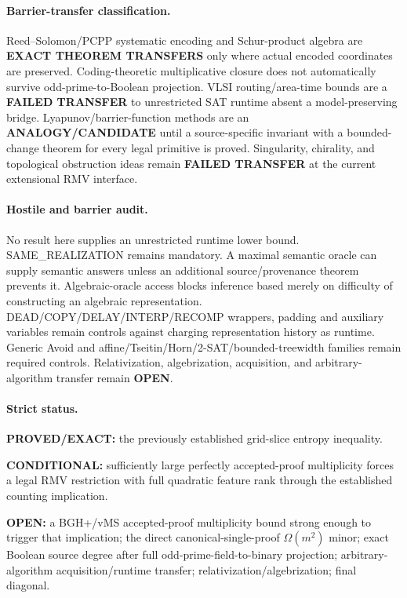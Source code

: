 \documentclass[11pt]{article}
\begin{document}
\paragraph{Barrier-transfer classification.}
Reed--Solomon/PCPP systematic encoding and Schur-product algebra are \textbf{EXACT THEOREM TRANSFERS} only where actual encoded coordinates are preserved. Coding-theoretic multiplicative closure does not automatically survive odd-prime-to-Boolean projection. VLSI routing/area-time bounds are a \textbf{FAILED TRANSFER} to unrestricted SAT runtime absent a model-preserving bridge. Lyapunov/barrier-function methods are an \textbf{ANALOGY/CANDIDATE} until a source-specific invariant with a bounded-change theorem for every legal primitive is proved. Singularity, chirality, and topological obstruction ideas remain \textbf{FAILED TRANSFER} at the current extensional RMV interface.

\paragraph{Hostile and barrier audit.}
No result here supplies an unrestricted runtime lower bound. SAME\_REALIZATION remains mandatory. A maximal semantic oracle can supply semantic answers unless an additional source/provenance theorem prevents it. Algebraic-oracle access blocks inference based merely on difficulty of constructing an algebraic representation. DEAD/COPY/DELAY/INTERP/RECOMP wrappers, padding and auxiliary variables remain controls against charging representation history as runtime. Generic Avoid and affine/Tseitin/Horn/2-SAT/bounded-treewidth families remain required controls. Relativization, algebrization, acquisition, and arbitrary-algorithm transfer remain \textbf{OPEN}.

\paragraph{Strict status.}
\textbf{PROVED/EXACT:} the previously established grid-slice entropy inequality.

\textbf{CONDITIONAL:} sufficiently large perfectly accepted-proof multiplicity forces a legal RMV restriction with full quadratic feature rank through the established counting implication.

\textbf{OPEN:} a BGH+/vMS accepted-proof multiplicity bound strong enough to trigger that implication; the direct canonical-single-proof $\Omega(m^2)$ minor; exact Boolean source degree after full odd-prime-field-to-binary projection; arbitrary-algorithm acquisition/runtime transfer; relativization/algebrization; final diagonal.
\end{document}

